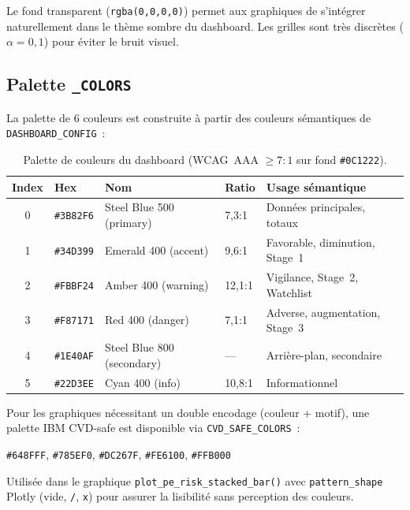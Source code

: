 \documentclass[12pt,a4paper]{article}
\begin{document}
\begin{interpretbox}
Le fond transparent (\texttt{rgba(0,0,0,0)}) permet aux graphiques de s'int\'egrer naturellement dans le th\`eme sombre du dashboard. Les grilles sont tr\`es discr\`etes ($\alpha = 0{,}1$) pour \'eviter le bruit visuel.
\end{interpretbox}

\subsection{Palette \texttt{\_COLORS}}

La palette de 6 couleurs est construite \`a partir des couleurs s\'emantiques de \texttt{DASHBOARD\_CONFIG}~:

\begin{table}[ht]
\centering
\caption{Palette de couleurs du dashboard (WCAG~AAA $\geq 7{:}1$ sur fond \texttt{\#0C1222}).}
\label{tab:colors}
\small
\begin{tabular}{@{}cllll@{}}
\toprule
\textbf{Index} & \textbf{Hex} & \textbf{Nom} & \textbf{Ratio} & \textbf{Usage s\'emantique} \\
\midrule
0 & \texttt{\#3B82F6} & Steel Blue 500 (primary) & 7,3:1 & Donn\'ees principales, totaux \\
1 & \texttt{\#34D399} & Emerald 400 (accent) & 9,6:1 & Favorable, diminution, Stage~1 \\
2 & \texttt{\#FBBF24} & Amber 400 (warning) & 12,1:1 & Vigilance, Stage~2, Watchlist \\
3 & \texttt{\#F87171} & Red 400 (danger) & 7,1:1 & Adverse, augmentation, Stage~3 \\
4 & \texttt{\#1E40AF} & Steel Blue 800 (secondary) & --- & Arri\`ere-plan, secondaire \\
5 & \texttt{\#22D3EE} & Cyan 400 (info) & 10,8:1 & Informationnel \\
\bottomrule
\end{tabular}
\end{table}

\begin{definitionbox}
Pour les graphiques n\'ecessitant un double encodage (couleur + motif), une palette IBM CVD-safe est disponible via \texttt{CVD\_SAFE\_COLORS}~:
\begin{center}
\texttt{\#648FFF}, \texttt{\#785EF0}, \texttt{\#DC267F}, \texttt{\#FE6100}, \texttt{\#FFB000}
\end{center}
Utilis\'ee dans le graphique \texttt{plot\_pe\_risk\_stacked\_bar()} avec \texttt{pattern\_shape} Plotly (vide, \texttt{/}, \texttt{x}) pour assurer la lisibilit\'e sans perception des couleurs.
\end{definitionbox}
\end{document}
